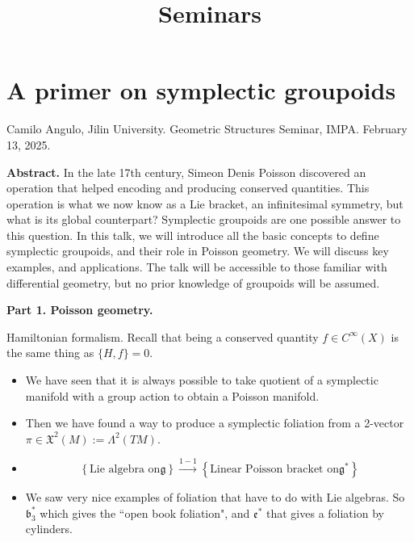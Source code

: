 



\title{Seminars}
\maketitle

\label{section-phantom}

\tableofcontents

\section{A primer on symplectic groupoids}
\label{section-prime-sympl-group}

\noindent
Camilo Angulo, Jilin University.
Geometric Structures Seminar, IMPA.
February 13, 2025.

\medskip\noindent
{\bf Abstract.}
In the late 17th century, Simeon Denis
Poisson discovered an operation that
helped encoding and producing conserved
quantities. This operation is what we
now know as a Lie bracket, an infinitesimal
symmetry, but what is its global
counterpart? Symplectic groupoids are one
possible answer to this question. In
this talk, we will introduce all the basic
concepts to define symplectic
groupoids, and their role in Poisson
geometry. We will discuss key examples, and
applications. The talk will be accessible to
those familiar with differential
geometry, but no prior knowledge of groupoids
will be assumed.


\medskip\noindent
{\bf Part 1. Poisson geometry.}

Hamiltonian formalism. Recall that being a
conserved quantity \(f \in
C^\infty(X)\) is the same thing as
\(\{H,f\}=0\).

\begin{itemize} \item We have seen that it is
always possible to take quotient
of a symplectic manifold with a group action
to obtain a  Poisson
manifold.  \item Then we have found a way to
produce a symplectic foliation
from a 2-vector \(\pi \in
\mathfrak{X}^2(M):=\Lambda^{2}(TM)\).  \item

\begin{remark}
\[\left\{ \text{Lie algebra on
\(\mathfrak{g}\)}
\right\} \xrightarrow{1-1}\left\{
\text{Linear Poisson bracket on
\(\mathfrak{g}^*\)}  \right\}  \]
\end{remark}

\item We saw very nice examples
of foliation that have to do with Lie
algebras. So \(\mathfrak{b}^*_3\) which
gives the ``open book foliation", and
\(\mathfrak{e}^*\) that gives a foliation
by cylinders.
\end{itemize}

